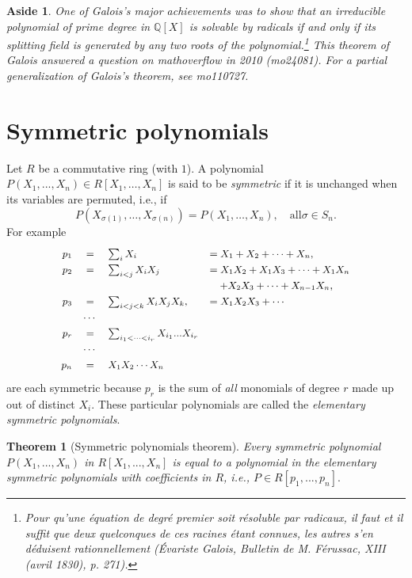 \documentclass[a4paper,11pt,final,openany]{memoir}
\newtheorem{theorem}[X]{Theorem}
\newtheorem{aside}[X]{Aside}
\theoremstyle{nonumberplain}
\begin{document}
\begin{aside}
One of Galois's major achievements was to show that an irreducible polynomial
of prime degree in $\mathbb{Q}{}[X]$ is solvable by radicals if and only if
its splitting field is generated by any two roots of the
polynomial.\footnote{Pour qu'une \'{e}quation de degr\'{e} premier soit
r\'{e}soluble par radicaux, il faut et il suffit que deux quelconques de ces
racines \'{e}tant connues, les autres s'en d\'{e}duisent rationnellement
(\'{E}variste Galois, Bulletin de M. F\'{e}russac, XIII (avril 1830), p.
271).} This theorem of Galois answered a question on mathoverflow in 2010
(mo24081). For a partial generalization of Galois's theorem, see mo110727.
\end{aside}

\section{Symmetric polynomials\label{sympol}}

Let $R$ be a commutative ring (with $1$). A polynomial $P(X_{1},...,X_{n})\in
R[X_{1},\ldots,X_{n}]$ is said to be \emph{symmetric\/}%
if it is unchanged when its variables are permuted, i.e., if
\[
P(X_{\sigma(1)},\ldots,X_{\sigma(n)})=P(X_{1},\ldots,X_{n}),\quad\text{all
}\sigma\in\text{$S_{n}$}.
\]
For example
\[
\renewcommand{\arraystretch}{1.3}%
\small
\begin{array}
[c]{rcll}%
p_{1} & = & \sum_{i}X_{i} & =X_{1}+X_{2}+\cdots+X_{n},\\
p_{2} & = & \sum_{i<{}j}X_{i}X_{j} & =X_{1}X_{2}+X_{1}X_{3}+\cdots+X_{1}%
X_{n}\\
&&&\quad +X_{2}X_{3}+\cdots+X_{n-1}X_{n},\\
p_{3} & = & \sum_{i<{}j<{}k}X_{i}X_{j}X_{k}, & =X_{1}X_{2}X_{3}+\cdots\\
& \cdots &  & \\
p_{r} & = & \sum_{i_{1}<{}\cdots<{}i_{r}}X_{i_{1}}...X_{i_{r}} & \\
& \cdots &  & \\
p_{n} & = & X_{1}X_{2}\cdots X_{n} &
\end{array}
\]
are each symmetric because $p_{r}$ is the sum of \textit{all\/} monomials of
degree $r$ made up out of distinct $X_{i}$. These particular polynomials are
called the \emph{elementary symmetric polynomials}.%
%


\begin{theorem}
[Symmetric polynomials theorem]\label{ag25}Every symmetric polynomial
$P(X_{1},...,X_{n})$ in $R[X_{1},...,X_{n}]$ is equal to a polynomial in the
elementary symmetric polynomials with coefficients in $R$, i.e., $P\in
R[p_{1},...,p_{n}].$
\end{theorem}
\end{document}
